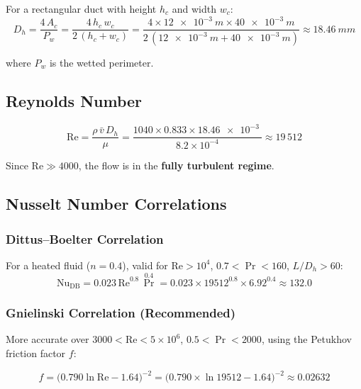 \documentclass[a4paper,11pt]{article}
\begin{document}
For a rectangular duct with height $h_c$ and width $w_c$:
\begin{equation}
  D_h = \frac{4\,A_c}{P_w} = \frac{4\,h_c\,w_c}{2\,(h_c+w_c)}
      = \frac{4\times\SI{12e-3}{m}\times\SI{40e-3}{m}}{2\,(\SI{12e-3}{m}+\SI{40e-3}{m})}
      \approx \SI{18.46}{mm}
\end{equation}

where $P_w$ is the wetted perimeter.

\subsection{Reynolds Number}

\begin{equation}
  \mathrm{Re} = \frac{\rho\,\bar{v}\,D_h}{\mu}
       = \frac{1040 \times 0.833 \times \SI{18.46e-3}{}}{8.2\times10^{-4}}
       \approx 19\,512
\end{equation}

Since $\mathrm{Re} \gg 4000$, the flow is in the \textbf{fully turbulent regime}.

\subsection{Nusselt Number Correlations}

\subsubsection{Dittus--Boelter Correlation}

For a heated fluid ($n=0.4$), valid for $\mathrm{Re}>10^4$,
$0.7<\Pr<160$, $L/D_h>60$:
\begin{equation}
  \mathrm{Nu}_{\mathrm{DB}} = 0.023\,\mathrm{Re}^{0.8}\,\Pr^{0.4}
                    = 0.023 \times 19512^{0.8} \times 6.92^{0.4}
                    \approx 132.0
\end{equation}

\subsubsection{Gnielinski Correlation (Recommended)}

More accurate over $3000 < \mathrm{Re} < 5\times10^6$, $0.5 < \Pr < 2000$,
using the Petukhov friction factor $f$:

\begin{equation}
  f = \bigl(0.790\ln\mathrm{Re} - 1.64\bigr)^{-2}
    = \bigl(0.790\times\ln 19512 - 1.64\bigr)^{-2}
    \approx 0.02632
\end{equation}
\end{document}
